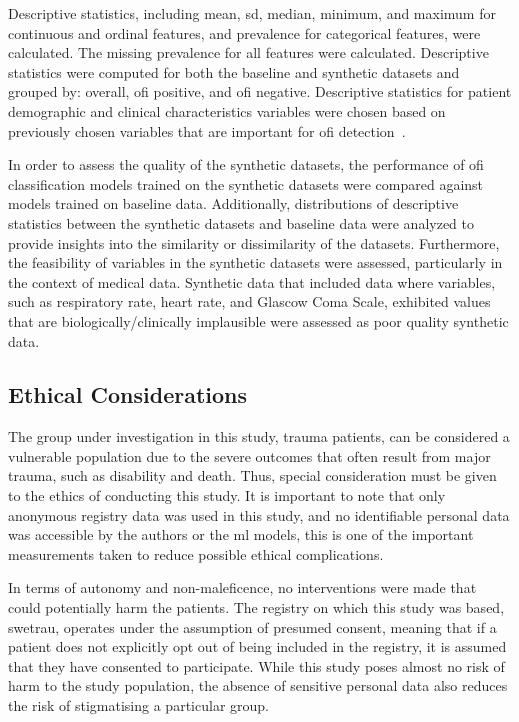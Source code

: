 \documentclass[12pt, a4paper]{article}
\begin{document}
Descriptive statistics, including mean, \acrfull{sd}, median, minimum, and maximum for continuous and ordinal features,
and prevalence for categorical features, were calculated. The missing prevalence for all features were calculated.
Descriptive statistics were computed for both the baseline and synthetic datasets and grouped by: overall,
\acrshort{ofi} positive, and \acrshort{ofi} negative. Descriptive statistics for patient demographic and clinical
characteristics variables were chosen based on previously chosen variables that are important for \acrshort{ofi}
detection~\cite{attergrim_predicting_2023}.

In order to assess the quality of the synthetic datasets, the performance of \acrshort{ofi} classification models
trained on the synthetic datasets were compared against models trained on baseline data. Additionally, distributions of
descriptive statistics between the synthetic datasets and baseline data were analyzed to provide insights into the
similarity or dissimilarity of the datasets. Furthermore, the feasibility of variables in the synthetic datasets were
assessed, particularly in the context of medical data. Synthetic data that included data where variables, such as
respiratory rate, heart rate, and Glascow Coma Scale, exhibited values that are biologically/clinically implausible
were assessed as poor quality synthetic data.

\subsection{Ethical Considerations}
The group under investigation in this study, trauma patients, can be considered a vulnerable population due to the
severe outcomes that often result from major trauma, such as disability and death. Thus, special consideration must be
given to the ethics of conducting this study. It is important to note that only anonymous registry data was used in
this study, and no identifiable personal data was accessible by the authors or the \acrshort{ml} models, this is one of
the important measurements taken to reduce possible ethical complications.

In terms of autonomy and non-maleficence, no interventions were made that could potentially harm the patients. The
registry on which this study was based, \acrshort{swetrau}, operates under the assumption of presumed consent, meaning
that if a patient does not explicitly opt out of being included in the registry, it is assumed that they have consented
to participate. While this study poses almost no risk of harm to the study population, the absence of sensitive
personal data also reduces the risk of stigmatising a particular group.
\end{document}

